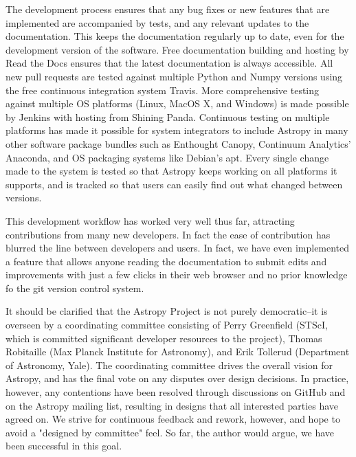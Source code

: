 \documentclass[11pt,twoside]{article}
\begin{document}
The development process ensures that any bug fixes or new features that are
implemented are accompanied by tests, and any relevant updates to the
documentation.  This keeps the documentation regularly up to date, even for the
development version of the software.  Free documentation building and hosting
by Read the Docs ensures that the latest documentation is always accessible.
All new pull requests are tested against multiple Python and Numpy versions
using the free continuous integration system Travis.  More comprehensive
testing against multiple OS platforms (Linux, MacOS X, and Windows) is made
possible by Jenkins with hosting from Shining Panda.  Continuous testing on
multiple platforms has made it possible for system integrators to include
Astropy in many other software package bundles such as Enthought Canopy,
Continuum Analytics' Anaconda, and OS packaging systems like Debian's apt.
Every single change made to the system is tested so that Astropy keeps working
on all platforms it supports, and is tracked so that users can easily find out
what changed between versions.

This development workflow has worked very well thus far, attracting
contributions from many new developers.  In fact the ease of contribution has
blurred the line between developers and users.  In fact, we have even
implemented a feature that allows anyone reading the documentation to submit
edits and improvements with just a few clicks in their web browser and no
prior knowledge fo the git version control system.

It should be clarified that the Astropy Project is not purely democratic--it is
overseen by a coordinating committee consisting of Perry Greenfield (STScI,
which is committed significant developer resources to the project), Thomas
Robitaille (Max Planck Institute for Astronomy), and Erik Tollerud (Department
of Astronomy, Yale).  The coordinating committee drives the overall vision for
Astropy, and has the final vote on any disputes over design decisions.  In
practice, however, any contentions have been resolved through discussions on
GitHub and on the Astropy mailing list, resulting in designs that all
interested parties have agreed on.  We strive for continuous feedback and
rework, however, and hope to avoid a "designed by committee" feel.  So far, the
author would argue, we have been successful in this goal.


\end{document}
